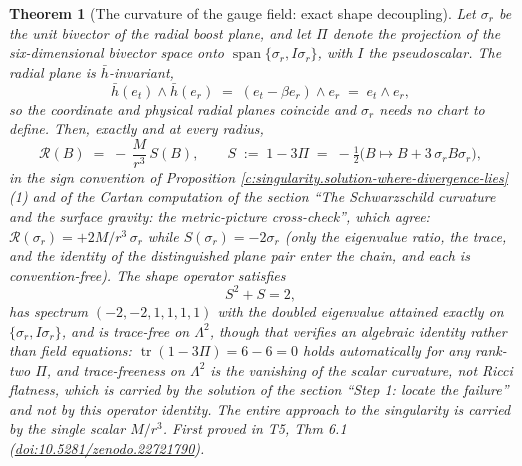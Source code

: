 \documentclass[11pt]{article}
\newtheorem{theorem}{Theorem}[section]
\theoremstyle{definition}
\theoremstyle{plain}
\providecommand{\er}{}\renewcommand{\er}{e_r}
\providecommand{\et}{}\renewcommand{\et}{e_t}
\providecommand{\hb}{}\renewcommand{\hb}{\bar{h}}
\providecommand{\tr}{}\renewcommand{\tr}{\operatorname{tr}}
\begin{document}
\begin{theorem}[The curvature of the gauge field: exact shape decoupling]\label{c:singularity.curvature-gauge-field-exact-shape-decoupling}
Let $\sigma_r$ be the unit bivector of the radial boost plane, and let $\Pi$ denote the projection of the six-dimensional bivector space onto $\operatorname{span}\{\sigma_r, I\sigma_r\}$, with $I$ the pseudoscalar. The radial plane is $\hb$-invariant,
\[
\hb(\et) \wedge \hb(\er) \;=\; (\et - \beta\er) \wedge \er \;=\; \et \wedge \er ,
\]
so the coordinate and physical radial planes coincide and $\sigma_r$ needs no chart to define. Then, exactly and at every radius,
\[
\mathcal{R}(B) \;=\; -\,\frac{M}{r^3}\,S(B), \qquad
S \;:=\; 1 - 3\Pi \;=\; -\tfrac12\bigl(B \mapsto B + 3\,\sigma_r B \sigma_r\bigr),
\]
in the sign convention of Proposition \ref{c:singularity.solution-where-divergence-lies}(1) and of the Cartan computation of the section ``The Schwarzschild curvature and the surface gravity: the metric-picture cross-check'', which agree: $\mathcal{R}(\sigma_r) = +2M/r^{3}\,\sigma_r$ while $S(\sigma_r) = -2\sigma_r$ (only the eigenvalue ratio, the trace, and the identity of the distinguished plane pair enter the chain, and each is convention-free). The shape operator satisfies
\[
S^2 + S = 2 ,
\]
has spectrum $(-2, -2, 1, 1, 1, 1)$ with the doubled eigenvalue attained exactly on $\{\sigma_r, I\sigma_r\}$, and is trace-free on $\Lambda^2$, though that verifies an algebraic identity rather than field equations: $\tr(1 - 3\Pi) = 6 - 6 = 0$ holds automatically for any rank-two $\Pi$, and trace-freeness on $\Lambda^2$ is the vanishing of the scalar curvature, not Ricci flatness, which is carried by the solution of the section ``Step 1: locate the failure'' and not by this operator identity. The entire approach to the singularity is carried by the single scalar $M/r^3$.
\emph{First proved in} T5, Thm 6.1 (\href{https://doi.org/10.5281/zenodo.22721790}{doi:10.5281/zenodo.22721790}).
\end{theorem}
\end{document}
